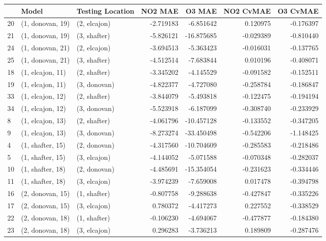 \begin{tabular}{lllrrrr}
\toprule
{} &             Model & Testing Location &   NO2 MAE &     O3 MAE &  NO2 CvMAE &  O3 CvMAE \\
\midrule
20 &  (1, donovan, 19) &     (2, elcajon) & -2.719183 &  -6.851642 &   0.120975 & -0.176397 \\
21 &  (1, donovan, 19) &     (3, shafter) & -5.826121 & -16.875685 &  -0.029389 & -0.810440 \\
24 &  (1, donovan, 21) &     (2, elcajon) & -3.694513 &  -5.363423 &  -0.016031 & -0.137765 \\
25 &  (1, donovan, 21) &     (3, shafter) & -4.512514 &  -7.683844 &   0.010196 & -0.408071 \\
18 &  (1, elcajon, 11) &     (2, shafter) & -3.345202 &  -4.145529 &  -0.091582 & -0.152511 \\
19 &  (1, elcajon, 11) &     (3, donovan) & -4.822377 &  -4.727080 &  -0.258784 & -0.186847 \\
33 &  (1, elcajon, 12) &     (2, shafter) & -3.844079 &  -5.493818 &  -0.122475 & -0.194194 \\
34 &  (1, elcajon, 12) &     (3, donovan) & -5.523918 &  -6.187099 &  -0.308740 & -0.233929 \\
8  &  (1, elcajon, 13) &     (2, shafter) & -4.061796 & -10.457128 &  -0.133552 & -0.347205 \\
9  &  (1, elcajon, 13) &     (3, donovan) & -8.273274 & -33.450498 &  -0.542206 & -1.148425 \\
4  &  (1, shafter, 15) &     (2, donovan) & -4.317560 & -10.704609 &  -0.285583 & -0.218486 \\
5  &  (1, shafter, 15) &     (3, elcajon) & -4.144052 &  -5.071588 &  -0.070348 & -0.282037 \\
10 &  (1, shafter, 18) &     (2, donovan) & -4.485691 & -15.354054 &  -0.231623 & -0.334446 \\
11 &  (1, shafter, 18) &     (3, elcajon) & -3.974239 &  -7.659008 &   0.017478 & -0.394798 \\
16 &  (2, donovan, 15) &     (1, shafter) & -0.807758 &  -9.288638 &  -0.427847 & -0.335226 \\
17 &  (2, donovan, 15) &     (3, elcajon) &  0.780372 &  -4.417273 &   0.227552 & -0.338529 \\
22 &  (2, donovan, 18) &     (1, shafter) & -0.106230 &  -4.694067 &  -0.477877 & -0.184380 \\
23 &  (2, donovan, 18) &     (3, elcajon) &  0.296283 &  -3.736213 &   0.189809 & -0.287476 \\

\end{tabular}
